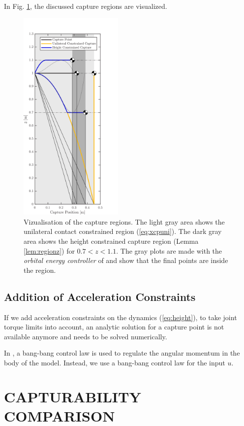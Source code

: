 \documentclass[letterpaper, 10 pt, conference]{ieeeconf}  %
\begin{document}
In Fig. \ref{fig:capregion}, the discussed capture regions are visualized.
\begin{figure}[h]
      \centering
      \includegraphics[width=2in]{CPLimits.png}
      \caption{Vizualisation of the capture regions. The light gray area shows the unilateral contact constrained region (\ref{eq:xcpuni}). The dark gray area shows the height constrained capture region (Lemma \ref{lem:regionz})  for $0.7<z<1.1$. The gray plots are made with the \textit{orbital energy controller} of \cite{koolen2016balance} and show that the final points are inside the region.}
      \label{fig:capregion}
\end{figure}
\subsection{Addition of Acceleration Constraints}\label{forcecapture}
If we add acceleration constraints on the dynamics (\ref{eq:height}), to take joint torque limits into account, an analytic solution for a capture point is not available anymore and needs to be solved numerically. 

In \cite{pratt2006capture,stephens2007humanoid,koolen2012capturability}, a bang-bang control law is used to regulate the angular momentum in the body of the model. Instead, we use a bang-bang control law for the input $u$.



\section{CAPTURABILITY COMPARISON}
\end{document}

